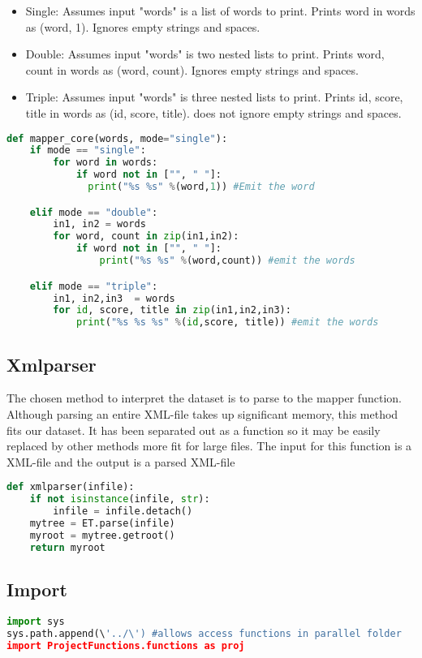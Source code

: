 \documentclass[fleqn,10pt]{wlscirep}
\begin{document}
\begin{itemize}
  \item Single: Assumes input "words" is a list of words to print. Prints word in words as (word, 1). Ignores empty strings and spaces.
  \item Double: Assumes input "words" is two nested lists to print. Prints word, count in words as (word, count). Ignores empty strings and spaces.
  \item Triple: Assumes input "words" is three nested lists to print. Prints id, score, title in words as (id, score, title). does not ignore empty strings and spaces.
\end{itemize}

\begin{lstlisting}[language=Python, caption=mapper\_core function]
def mapper_core(words, mode="single"):
    if mode == "single":
        for word in words:
            if word not in ["", " "]:
              print("%s %s" %(word,1)) #Emit the word

    elif mode == "double":
        in1, in2 = words
        for word, count in zip(in1,in2):
            if word not in ["", " "]:
                print("%s %s" %(word,count)) #emit the words

    elif mode == "triple":
        in1, in2,in3  = words
        for id, score, title in zip(in1,in2,in3):
            print("%s %s %s" %(id,score, title)) #emit the words

\end{lstlisting}

\subsection{Xmlparser}
The chosen method to interpret the dataset is to parse to the mapper function. Although parsing an entire XML-file takes up significant memory, this method fits our dataset. It has been separated out as a function so it may be easily replaced by other methods more fit for large files. The input for this function is a XML-file and the output is a parsed XML-file 

\begin{lstlisting}[language=Python, caption=xmlparser function]
def xmlparser(infile):
    if not isinstance(infile, str):
        infile = infile.detach()
    mytree = ET.parse(infile)
    myroot = mytree.getroot()
    return myroot
\end{lstlisting}

\subsection{Import}
\begin{lstlisting}[language=Python, caption=xmlparser function]
import sys
sys.path.append(\'../\') #allows access functions in parallel folder
import ProjectFunctions.functions as proj
\end{lstlisting}
\end{document}
